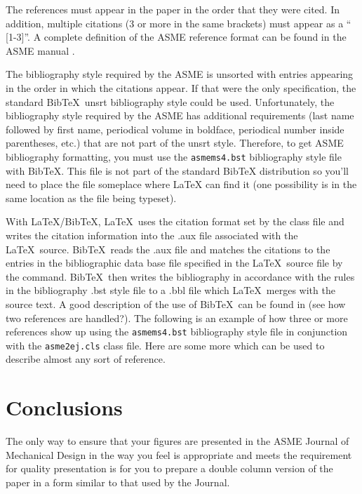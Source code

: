 \documentclass[12pt]{asme2ej}
\begin{document}
    The references must appear in the paper in the order that they were cited. In addition, multiple citations (3 or more in the same brackets) must appear as a `` [1-3]''. A complete definition of the ASME reference format can be found in the ASME manual \cite{asmemanual}.

    The bibliography style required by the ASME is unsorted with entries appearing in the order in which the citations appear. If that were the only specification, the standard {\sc Bib}\TeX\ unsrt bibliography style could be used. Unfortunately, the bibliography style required by the ASME has additional requirements (last name followed by first name, periodical volume in boldface, periodical number inside parentheses, etc.) that are not part of the unsrt style. Therefore, to get ASME bibliography formatting, you must use the \verb+asmems4.bst+ bibliography style file with {\sc Bib}\TeX. This file is not part of the standard BibTeX distribution so you'll need to place the file someplace where LaTeX can find it (one possibility is in the same location as the file being typeset).

    With \LaTeX/{\sc Bib}\TeX, \LaTeX\ uses the citation format set by the class file and writes the citation information into the .aux file associated with the \LaTeX\ source. {\sc Bib}\TeX\ reads the .aux file and matches the citations to the entries in the bibliographic data base file specified in the \LaTeX\ source file by the \verb++ command. {\sc Bib}\TeX\ then writes the bibliography in accordance with the rules in the bibliography .bst style file to a .bbl file which \LaTeX\ merges with the source text. A good description of the use of {\sc Bib}\TeX\ can be found in \cite{latex, goosens} (see how two references are handled?). The following is an example of how three or more references \cite{latex, asmemanual,  goosens} show up using the \verb+asmems4.bst+ bibliography style file in conjunction with the \verb+asme2ej.cls+ class file. Here are some more \cite{art, blt, ibk, icn, ips, mts, mis, pro, pts, trt, upd} which can be used to describe almost any sort of reference.



    \section{Conclusions}
    The only way to ensure that your figures are presented in the ASME Journal of Mechanical Design in the way you feel is appropriate and meets the requirement for quality presentation is for you to prepare a double column version of the paper in a form similar to that used by the Journal.
\end{document}
